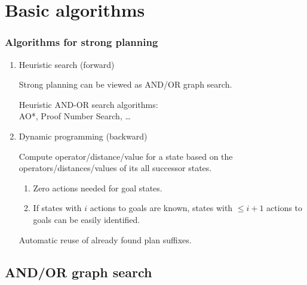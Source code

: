 \documentclass{gkibeamer}
\begin{document}
\section{Basic algorithms}

\begin{frame}
  \frametitle{Algorithms for strong planning}

  \begin{enumerate}
  \item \alert{Heuristic search} (forward)

    Strong planning can be viewed as AND/OR graph search.
    Heuristic AND-OR search algorithms: \\
    AO*, Proof Number Search, \dots
  \item \alert{Dynamic programming} (backward)
    
    Compute operator/distance/value for a state based on the
    operators/distances/values of its all successor states.
    \begin{enumerate}
    \item Zero actions needed for goal states.
    \item If states with $i$ actions to goals are known,
      states with $\leq i+1$ actions to goals can be easily identified.
    \end{enumerate}
    Automatic reuse of already found plan suffixes.
  \end{enumerate}
\end{frame}

\subsection{AND/OR graph search}
\end{document}
